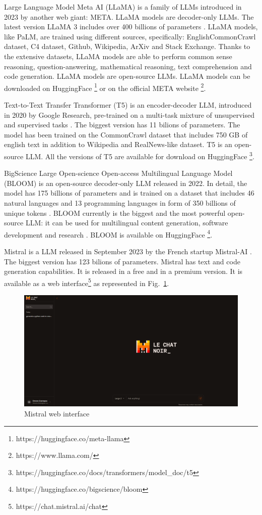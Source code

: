 Large Language Model Meta AI (LLaMA) is a family of LLMs introduced in 2023 by another web giant: META.
LLaMA models are decoder-only LLMs.
The latest version LLaMA 3 includes over 400 billions of parameters \cite{llama3_intro}.
LLaMA models, like PaLM, are trained using different sources, specifically: EnglishCommonCrawl dataset, C4 dataset, Github, Wikipedia, ArXiv and Stack Exchange.
Thanks to the extensive datasets, LLaMA models are able to perform common sense reasoning, question-answering, mathematical reasoning, text comprehension and code generation.
LLaMA models are open-source LLMs.
LLaMA models can be downloaded on HuggingFace \footnote{https://huggingface.co/meta-llama} or on the official META website \footnote{https://www.llama.com/}.


Text-to-Text Transfer Transformer (T5) is an encoder-decoder LLM, introduced in 2020 by Google Research, pre-trained on a multi-task mixture of unsupervised and supervised tasks \cite{raffel2020exploring}.
The biggest version has 11 bilions of parameters.
The model has been trained on the CommonCrawl dataset that includes 750 GB of english text in addition to Wikipedia and RealNews-like dataset.
T5 is an open-source LLM.
All the versions of T5 are available for download on HuggingFace \footnote{https://huggingface.co/docs/transformers/model\_doc/t5}.

BigScience Large Open-science Open-access Multilingual Language Model (BLOOM) is an open-source decoder-only LLM released in 2022.
In detail, the model has 175 billions of parameters and is trained on a dataset that includes 46 natural languages and 13 programming languages in form of 350 billions of unique tokens \cite{le2023bloom}.
BLOOM currently is the biggest and the most powerful open-source LLM: it can be used for multilingual content generation, software development and research \cite{exploring_bloom}.
BLOOM is available on HuggingFace \footnote{https://huggingface.co/bigscience/bloom}.

Mistral is a LLM released in September 2023 by the French startup Mistral-AI \cite{jiang2023mistral}.
The biggest version has 123 bilions of parameters.
Mistral has text and code generation capabilities.
It is released in a free and in a premium version.
It is available as a web interface\footnote{https://chat.mistral.ai/chat} as represented in Fig.~\ref{fig_20}.
\begin{figure}[H]
    \centering
    \includegraphics[width=0.9\linewidth]{Figures/fig_20.png}
    \caption{Mistral web interface}
    \label{fig_20}
\end{figure}

